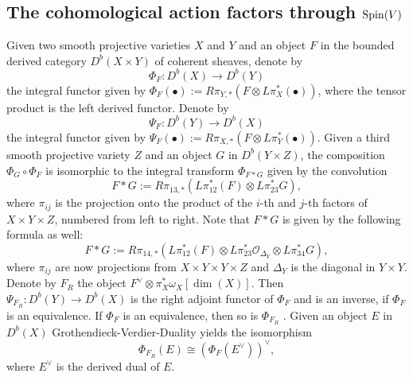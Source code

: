 \documentclass[12pt]{amsart}
\numberwithin{equation}{subsection}
\theoremstyle{plain}
\theoremstyle{definition}
\newcommand{\Spin}{{\rm Spin}}
\newcommand{\StructureSheaf}[1]{{\mathcal O}_{#1}}
\begin{document}
\subsection{The cohomological action factors through $\Spin(V)$}
\label{sec-cohomological-action-of-derived-equivalences}
Given two smooth projective varieties $X$ and $Y$ and an object $F$ in the bounded derived category $D^b(X\times Y)$ of coherent sheaves, denote by 
\[
\Phi_F:D^b(X)\rightarrow D^b(Y)
\]
the integral functor given by $\Phi_F(\bullet):=R\pi_{Y,*}(F\otimes L\pi_X^*(\bullet))$, where the tensor product  is the left derived functor. Denote by 
\[
\Psi_F:D^b(Y)\rightarrow D^b(X)
\]
the integral functor given by $\Psi_F(\bullet):=R\pi_{X,*}(F\otimes L\pi_Y^*(\bullet))$.
Given a third smooth projective variety $Z$ and an object $G$ in $D^b(Y\times Z)$, the composition 
$\Phi_G\circ \Phi_F$ is isomorphic to the integral transform $\Phi_{F\ast G}$ given by the convolution
\[
F\ast G := R\pi_{13,*}(L\pi_{12}^*(F)\otimes L\pi_{23}^*G),
\]
where $\pi_{ij}$ is the projection onto the product of the $i$-th and $j$-th factors of $X\times Y\times Z$, numbered from left to right. 
Note that $F\ast G$ is given by the following formula as well:
\[
F\ast G := R\pi_{14,*}(L\pi_{12}^*(F)\otimes L\pi_{23}^*\StructureSheaf{\Delta_{Y}} \otimes L\pi_{34}^*G),
\]
where $\pi_{ij}$ are now projections from $X\times Y\times Y \times Z$ and 
$\Delta_{Y}$ is the diagonal in $Y\times Y$. 
Denote by $F_R$ the object $F^\vee\otimes \pi_X^*\omega_X[\dim(X)]$. Then $\Psi_{F_R}:D^b(Y)\rightarrow D^b(X)$ is the right adjoint functor of $\Phi_F$ and is an inverse,  if $\Phi_F$ is an equivalence. If $\Phi_F$ is an equivalence, then  so is $\Phi_{F_R}$ \cite[Rem. 7.7]{huybrechts-derived-categories-book}. Given an object $E$ in $D^b(X)$ Grothendieck-Verdier-Duality yields the isomorphism 
\begin{equation}
\label{eq-Phi-F-R-is-conjugate-of-Phi-F}
\Phi_{F_R}(E)\cong \left(\Phi_F(E^\vee)\right)^\vee,
\end{equation}
where $E^\vee$ is the derived dual of $E$. 
\end{document}
